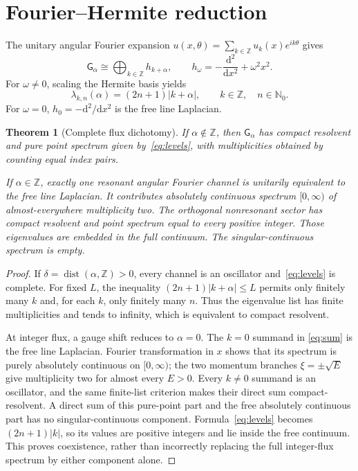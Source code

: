 \documentclass[10pt]{article}
\newtheorem{theorem}{Theorem}
\newcommand{\Z}{\mathbb Z}
\newcommand{\N}{\mathbb N}
\newcommand{\D}{\mathrm d}
\newcommand{\G}{\mathsf G}
\begin{document}
\section{Fourier--Hermite reduction}
The unitary angular Fourier expansion
$u(x,\theta)=\sum_{k\in\Z}u_k(x)e^{ik\theta}$ gives
\begin{equation}\label{eq:sum}
 \G_\alpha\cong\bigoplus_{k\in\Z}h_{k+\alpha},
 \qquad h_\omega=-\frac{\D^2}{\D x^2}+\omega^2x^2.
\end{equation}
For $\omega\ne0$, scaling the Hermite basis yields
\begin{equation}\label{eq:levels}
 \lambda_{k,n}(\alpha)=(2n+1)|k+\alpha|,
 \qquad k\in\Z,\quad n\in\N_0.
\end{equation}
For $\omega=0$, $h_0=-\D^2/\D x^2$ is the free line Laplacian.

\begin{theorem}[Complete flux dichotomy]\label{thm:dichotomy}
If $\alpha\notin\Z$, then $\G_\alpha$ has compact resolvent and pure point
spectrum given by~\eqref{eq:levels}, with multiplicities obtained by counting
equal index pairs.

If $\alpha\in\Z$, exactly one resonant angular Fourier channel is unitarily
equivalent to the free line Laplacian.  It contributes absolutely continuous
spectrum $[0,\infty)$ of almost-everywhere multiplicity two.  The orthogonal
nonresonant sector has compact resolvent and point spectrum equal to every
positive integer.  Those eigenvalues are embedded in the full continuum.
The singular-continuous spectrum is empty.
\end{theorem}
\begin{proof}
If $\delta=\operatorname{dist}(\alpha,\Z)>0$, every channel is an oscillator
and~\eqref{eq:levels} is complete.  For fixed $L$, the inequality
$(2n+1)|k+\alpha|\leq L$ permits only finitely many $k$ and, for each $k$,
only finitely many $n$.  Thus the eigenvalue list has finite multiplicities
and tends to infinity, which is equivalent to compact resolvent.

At integer flux, a gauge shift reduces to $\alpha=0$.  The $k=0$ summand in
\eqref{eq:sum} is the free line Laplacian.  Fourier transformation in $x$
shows that its spectrum is purely absolutely continuous on $[0,\infty)$;
the two momentum branches $\xi=\pm\sqrt E$ give multiplicity two for almost
every $E>0$.  Every $k\ne0$ summand is an oscillator, and the same finite-list
criterion makes their direct sum compact-resolvent.  A direct sum of this
pure-point part and the free absolutely continuous part has no
singular-continuous component.  Formula~\eqref{eq:levels} becomes
$(2n+1)|k|$, so its values are positive integers and lie inside the free
continuum.  This proves coexistence, rather than incorrectly replacing the
full integer-flux spectrum by either component alone.
\end{proof}
\end{document}
